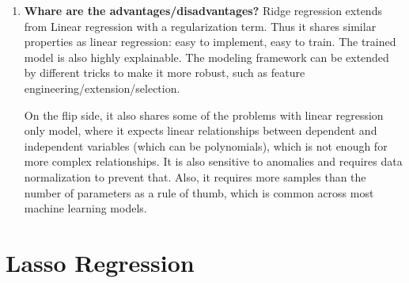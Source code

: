 \documentclass{article}
\begin{document}
\begin{enumerate}
    \item \textbf{Whare are the advantages/disadvantages?}
    \noindent 
    \smallbreak
    Ridge regression extends from Linear regression with a regularization term. Thus it shares similar properties as linear regression: easy to implement, easy to train. The trained model is also highly explainable. The modeling framework can be extended by different tricks to make it more robust, such as feature engineering/extension/selection.
    
    On the flip side, it also shares some of the problems with linear regression only model, where it expects linear relationships between dependent and independent variables (which can be polynomials), which is not enough for more complex relationships. It is also sensitive to anomalies and requires data normalization to prevent that. Also, it requires more samples than the number of parameters as a rule of thumb, which is common across most machine learning models.
    
\end{enumerate}

\section{Lasso Regression}
\end{document}

